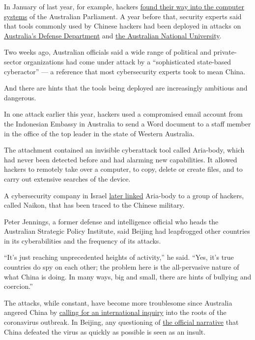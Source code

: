 In January of last year, for example, hackers
\href{https://www.nytimes3xbfgragh.onion/2019/02/07/world/australia/cyberattack-parliament-hack.html}{found
their way into the computer systems} of the Australian Parliament. A
year before that, security experts said that tools commonly used by
Chinese hackers had been deployed in attacks on
\href{https://www.smh.com.au/world/north-america/tens-of-thousands-of-australian-firms-could-be-affected-by-chinese-hack-top-official-20181221-p50nl0.html}{Australia's
Defense Department} and
\href{https://www.smh.com.au/politics/federal/chinese-hackers-breach-anu-putting-national-security-at-risk-20180706-p4zq0q.html}{the
Australian National University}.

Two weeks ago, Australian officials said a wide range of political and
private-sector organizations had come under attack by a ``sophisticated
state-based cyberactor'' --- a reference that most cybersecurity experts
took to mean China.

And there are hints that the tools being deployed are increasingly
ambitious and dangerous.

In one attack earlier this year, hackers used a compromised email
account from the Indonesian Embassy in Australia to send a Word document
to a staff member in the office of the top leader in the state of
Western Australia.

The attachment contained an invisible cyberattack tool called Aria-body,
which had never been detected before and had alarming new capabilities.
It allowed hackers to remotely take over a computer, to copy, delete or
create files, and to carry out extensive searches of the device.

A cybersecurity company in Israel
\href{https://www.nytimes3xbfgragh.onion/2020/05/07/world/asia/china-hacking-military-aria.html}{later
linked} Aria-body to a group of hackers, called Naikon, that has been
traced to the Chinese military.

Peter Jennings, a former defense and intelligence official who heads the
Australian Strategic Policy Institute, said Beijing had leapfrogged
other countries in its cyberabilities and the frequency of its attacks.

``It's just reaching unprecedented heights of activity,'' he said.
``Yes, it's true countries do spy on each other; the problem here is the
all-pervasive nature of what China is doing. In many ways, big and
small, there are hints of bullying and coercion.''

The attacks, while constant, have become more troublesome since
Australia angered China by
\href{https://www.nytimes3xbfgragh.onion/2020/05/11/world/australia/coronavirus-china-inquiry.html}{calling
for an international inquiry} into the roots of the coronavirus
outbreak. In Beijing, any questioning of
\href{https://www.nytimes3xbfgragh.onion/2020/04/08/world/asia/coronavirus-china-narrative.html}{the
official narrative} that China defeated the virus as quickly as possible
is seen as an insult.

